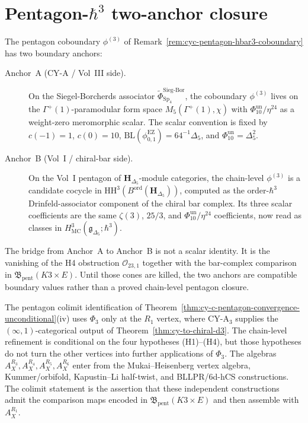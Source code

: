\section{Pentagon-\texorpdfstring{$\hbar^3$}{hbar-3} two-anchor closure}
\label{sec:cyc-pentagon-two-anchor}

\begin{remark}
\label{rem:cyc-pentagon-two-anchor-closure}
The pentagon coboundary \(\phi^{(3)}\) of
Remark~\ref{rem:cyc-pentagon-hbar3-coboundary} has two boundary
anchors:
\begin{description}
 \item[Anchor~A (CY-A / Vol~III side).] On the Siegel-Borcherds associator
 $\widetilde\Phi^{\mathrm{Sieg\text{-}Bor}}_{\mathrm{Sp}_4}$,
 the coboundary $\phi^{(3)}$ lives on the $\Gamma^+(1)$-paramodular form space $M_5(\Gamma^+(1), \chi)$ with \(\Phi_{10}^{\mathrm{un}}/\eta^{24}\) as a weight-zero meromorphic scalar. The scalar convention is fixed by \(c(-1)=1\), \(c(0)=10\), \(\mathrm{BL}(\phi_{0,1}^{\mathrm{EZ}})=64^{-1}\Delta_5\), and \(\Phi_{10}^{\mathrm{un}}=\Delta_5^2\).
 \item[Anchor~B (Vol~I / chiral-bar side).] On the Vol~I pentagon of
 $\mathbf{H}_{\Delta_5}$-module categories, the chain-level $\phi^{(3)}$ is a candidate cocycle in \(\mathrm{HH}^3(B^{\mathrm{ord}}(\mathbf{H}_{\Delta_5}))\), computed as the order-\(\hbar^3\) Drinfeld-associator component of the chiral bar complex. Its three scalar coefficients are the same \(\zeta(3)\), \(25/3\), and \(\Phi_{10}^{\mathrm{un}}/\eta^{24}\) coefficients, now read as classes in \(H^3_{\mathrm{MC}}(\mathfrak g_{\Delta_5};\hbar^3)\).
\end{description}
The bridge from Anchor~A to Anchor~B is not a scalar identity. It is the
vanishing of the H4 obstruction \(\mathcal O_{23,1}\) together with the
bar-complex comparison in \(\mathfrak B_{\mathrm{pent}}(K3\times E)\).
Until those cones are killed, the two anchors are compatible boundary
values rather than a proved chain-level pentagon closure.
\end{remark}

\begin{remark}
\label{rem:cyc-pentagon-phi3-scope}
The pentagon colimit identification of
Theorem~\ref{thm:cy-c-pentagon-convergence-unconditional}(iv) uses
\(\Phi_3\) only at the \(R_1\) vertex, where CY-A$_3$ supplies the
\((\infty,1)\)-categorical output of
Theorem~\ref{thm:cy-to-chiral-d3}. The chain-level refinement is
conditional on the four hypotheses (H1)--(H4), but those hypotheses do
not turn the other vertices into further applications of \(\Phi_3\).
The algebras \(A_X^{R_3},A_X^{R_4},A_X^{R_5},A_X^{R_6}\) enter from
the Mukai--Heisenberg vertex algebra, Kummer/orbifold, Kapustin--Li half-twist, and
BLLPR/6d-hCS constructions. The colimit statement is the assertion that
these independent constructions admit the comparison maps encoded in
\(\mathfrak B_{\mathrm{pent}}(K3\times E)\) and then assemble with
\(A_X^{R_1}\).
\end{remark}

